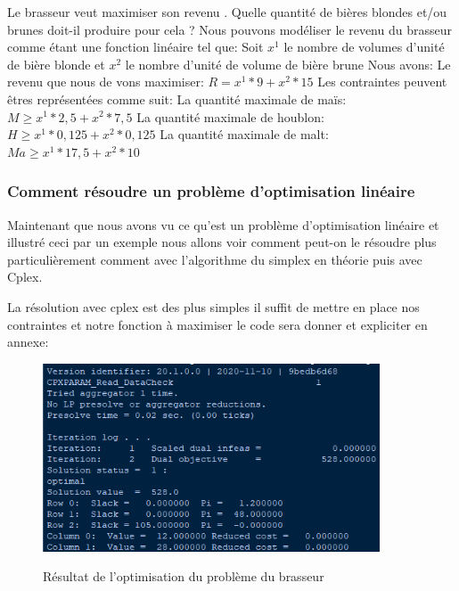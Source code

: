 Le brasseur veut maximiser son revenu .\newline
Quelle quantité de bières blondes et/ou brunes doit-il produire pour cela ?\newline
\newline
Nous pouvons modéliser le revenu du brasseur comme étant une fonction linéaire tel que:\newline
Soit $x^{1}$ le nombre de volumes d'unité de bière blonde et $x^{2}$ le nombre d'unité de volume de bière brune\newline
Nous avons:\newline\newline
Le revenu que nous de vons maximiser: $R = x^{1}*9 + x^{2}*15$\newline\newline
Les contraintes peuvent êtres représentées comme suit:\newline\newline
La quantité maximale de maïs: $M \geq x^{1}*2,5+x^{2}*7,5$\newline
La quantité maximale de houblon: $H \geq x^{1}*0,125+x^{2}*0,125$\newline
La quantité maximale de malt: $Ma \geq x^{1}*17,5+x^{2}*10$\newline\newline

\subsubsection{Comment résoudre un problème d'optimisation linéaire}

 Maintenant que nous avons vu ce qu'est un problème d'optimisation linéaire et illustré ceci par un exemple nous allons voir comment peut-on le résoudre plus particulièrement comment avec l'algorithme du simplex en théorie puis avec Cplex.

 La résolution avec cplex est des plus simples il suffit de mettre en place nos contraintes et notre fonction à maximiser le code sera donner et expliciter en annexe:

 \begin{figure}[h]
   \begin{center}
 \includegraphics[width=10cm]{./images/Brasseur_Resolution.png}\label{Resultat_Brasseur}
 \caption{Résultat de l'optimisation du problème du brasseur}
 \end{center}
 \end{figure}

